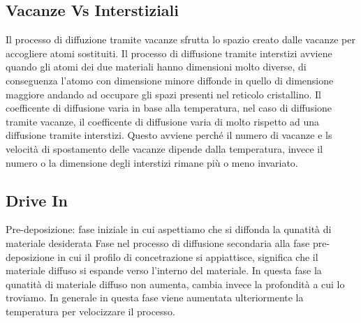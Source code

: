\documentclass{article}%
\begin{document}
\subsection{ Vacanze Vs Interstiziali }%
\label{subsec:VacanzeVsInterstiziali}%
Il processo di diffuzione tramite vacanze sfrutta lo spazio creato dalle vacanze per accogliere atomi sostituiti.\newline%
%
Il processo di diffusione tramite interstizi avviene quando gli atomi dei due materiali hanno dimensioni molto diverse, di conseguenza l'atomo con dimensione minore diffonde in quello di dimensione maggiore andando ad occupare gli spazi presenti nel reticolo cristallino.\newline%
%
\newline%
%
Il coefficente di diffusione varia in base alla temperatura, nel caso di diffusione tramite vacanze, il coefficente di diffusione varia di molto rispetto ad una diffusione tramite interstizi. Questo avviene perché il numero di vacanze e ls velocità di spostamento delle vacanze dipende dalla temperatura, invece il numero o la dimensione degli interstizi rimane più o meno invariato.\newline%
%
\newline%

%
\subsection{ Drive In }%
\label{subsec:DriveIn}%
Pre{-}deposizione: fase iniziale in cui aspettiamo che si diffonda la qunatità di materiale desiderata\newline%
%
Fase nel processo di diffusione secondaria alla fase pre{-}deposizione in cui il profilo di concetrazione si appiattisce, significa che il materiale diffuso si espande verso l'interno del materiale.\newline%
%
In questa fase la qunatità di materiale diffuso non aumenta, cambia invece la profondità a cui lo troviamo.\newline%
%
In generale in questa fase viene aumentata ulteriormente la temperatura per velocizzare il processo.\newline%
%
\newline%

%
\end{document}

